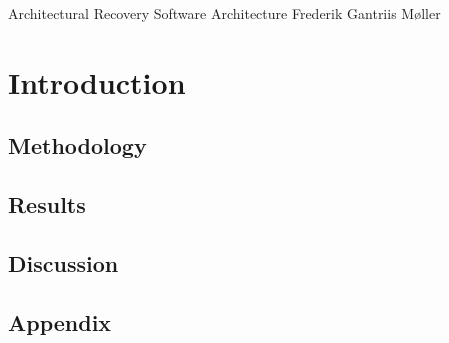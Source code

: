 \documentclass{solutionclass} %
\begin{document}
\pretitle
{Architectural Recovery}               %
{Software Architecture}        %
{Frederik Gantriis Møller}                 %

\def\homeworkNumber{5}

\makeatletter
    \startcontents[sections]
    \chapter{Introduction}
\makeatother



\section{Methodology}

\section{Results}

\section{Discussion} 

\section{Appendix}
    
    \thispagestyle{fancyplain}
    \fancyhead{}
    \renewcommand{\headrulewidth}{0pt}
\end{document}
